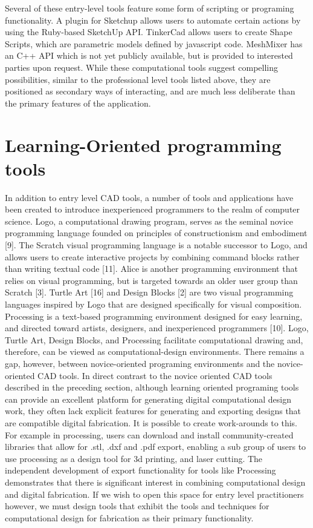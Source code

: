 Several of these entry-level tools feature some form of scripting or programing functionality. A plugin for Sketchup allows users to automate certain actions by using the Ruby-based SketchUp API. TinkerCad allows users to create Shape Scripts, which are parametric models defined by javascript code. MeshMixer has an C++ API which is not yet publicly available, but is provided to interested parties upon request. While these computational tools suggest compelling possibilities, similar to the professional level tools listed above, they are positioned as secondary ways of interacting, and are much less deliberate than the primary features of the application.

\section{Learning-Oriented programming tools}
In addition to entry level CAD tools, a number of tools and applications have been created to introduce inexperienced programmers to the realm of computer science. 
Logo, a computational drawing program, serves as the seminal novice programming language founded on principles of constructionism and embodiment [9]. The Scratch visual programming language is a notable successor to Logo, and allows users to create interactive projects by combining command blocks rather than writing textual code [11]. Alice is another programming environment that relies on visual programming, but is targeted towards an older user group than Scratch [3]. Turtle Art [16] and Design Blocks [2] are two visual programming languages inspired by Logo that are designed specifically for visual composition. Processing is a text-based programming environment designed for easy learning, and directed toward artists, designers, and inexperienced programmers [10].
Logo, Turtle Art, Design Blocks, and Processing facilitate computational drawing and, therefore, can be viewed as computational-design environments. There remains a gap, however, between novice-oriented programing environments and the novice-oriented CAD tools. In direct contrast to the novice oriented CAD tools described in the preceding section, although learning oriented programing tools can provide an excellent platform for generating digital computational design work, they often lack explicit features for generating and exporting designs that are compatible digital fabrication. It is possible to create work-arounds to this. For example in processing, users can download and install community-created libraries that allow for .stl, .dxf and .pdf export, enabling a sub group of users to use processing as a design tool for 3d printing, and laser cutting. The independent development of export functionality for tools like Processing demonstrates that there is significant interest in combining computational design and digital fabrication. If we wish to open this space for entry level practitioners however, we must design tools that exhibit the tools and techniques for computational design for fabrication as their primary functionality.

